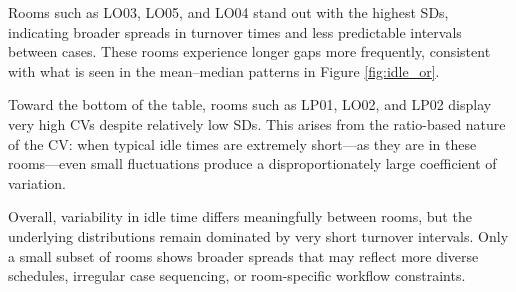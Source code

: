 \documentclass[
]{article}
\begin{document}
Rooms such as LO03, LO05, and LO04 stand out with the highest SDs,
indicating broader spreads in turnover times and less predictable
intervals between cases. These rooms experience longer gaps more
frequently, consistent with what is seen in the mean--median patterns in
Figure \ref{fig:idle_or}.

Toward the bottom of the table, rooms such as LP01, LO02, and LP02
display very high CVs despite relatively low SDs. This arises from the
ratio-based nature of the CV: when typical idle times are extremely
short---as they are in these rooms---even small fluctuations produce a
disproportionately large coefficient of variation.

Overall, variability in idle time differs meaningfully between rooms,
but the underlying distributions remain dominated by very short turnover
intervals. Only a small subset of rooms shows broader spreads that may
reflect more diverse schedules, irregular case sequencing, or
room-specific workflow constraints.
\end{document}
